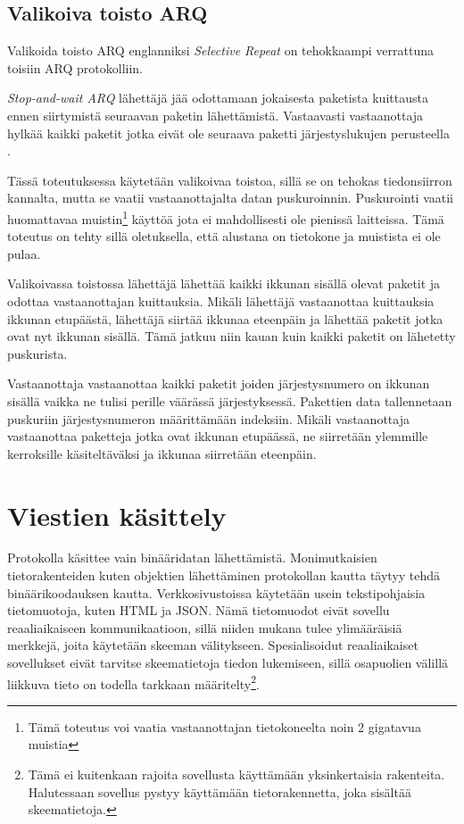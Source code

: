\documentclass[a4paper,12pt]{article}
\begin{document}
    \subsection{Valikoiva toisto ARQ}\label{subsec:valikoiva_toisto}
    Valikoida toisto ARQ englanniksi \textit{Selective Repeat} on tehokkaampi verrattuna toisiin ARQ protokolliin. 

    \begin{framed}
       \textit{Stop-and-wait ARQ} lähettäjä jää odottamaan jokaisesta paketista kuittausta ennen siirtymistä seuraavan paketin lähettämistä. Vastaavasti vastaanottaja hylkää kaikki paketit jotka eivät ole seuraava paketti järjestyslukujen perusteella \cite{StopAndWaitARQ}. 
    \end{framed}

    Tässä toteutuksessa käytetään valikoivaa toistoa, sillä se on tehokas tiedonsiirron kannalta, mutta se vaatii vastaanottajalta datan puskuroinnin. Puskurointi vaatii huomattavaa muistin\footnote{Tämä toteutus voi vaatia vastaanottajan tietokoneelta noin 2 gigatavua muistia} käyttöä jota ei mahdollisesti ole pienissä laitteissa. Tämä toteutus on tehty sillä oletuksella, että alustana on tietokone ja muistista ei ole pulaa.\par 

    Valikoivassa toistossa lähettäjä lähettää kaikki ikkunan sisällä olevat paketit ja odottaa vastaanottajan kuittauksia. Mikäli lähettäjä vastaanottaa kuittauksia ikkunan etupäästä, lähettäjä siirtää ikkunaa eteenpäin ja lähettää paketit jotka ovat nyt ikkunan sisällä. Tämä jatkuu niin kauan kuin kaikki paketit on lähetetty puskurista. \par 

    Vastaanottaja vastaanottaa kaikki paketit joiden järjestysnumero on ikkunan sisällä vaikka ne tulisi perille väärässä järjestyksessä. Pakettien data tallennetaan puskuriin järjestysnumeron määrittämään indeksiin. Mikäli vastaanottaja vastaanottaa paketteja jotka ovat ikkunan etupäässä, ne siirretään ylemmille kerroksille käsiteltäväksi ja ikkunaa siirretään eteenpäin.    

\section{Viestien käsittely}
Protokolla käsittee vain binääridatan lähettämistä. Monimutkaisien tietorakenteiden kuten objektien lähettäminen protokollan kautta täytyy tehdä binäärikoodauksen kautta. Verkkosivustoissa käytetään usein tekstipohjaisia tietomuotoja, kuten HTML ja JSON. Nämä tietomuodot eivät sovellu reaaliaikaiseen kommunikaatioon, sillä niiden mukana tulee ylimääräisiä merkkejä, joita käytetään skeeman välitykseen. Spesialisoidut reaaliaikaiset sovellukset eivät tarvitse skeematietoja tiedon lukemiseen, sillä osapuolien välillä liikkuva tieto on todella tarkkaan määritelty\footnote{Tämä ei kuitenkaan rajoita sovellusta käyttämään yksinkertaisia rakenteita. Halutessaan sovellus pystyy käyttämään tietorakennetta, joka sisältää skeematietoja.}. \par
\end{document}
